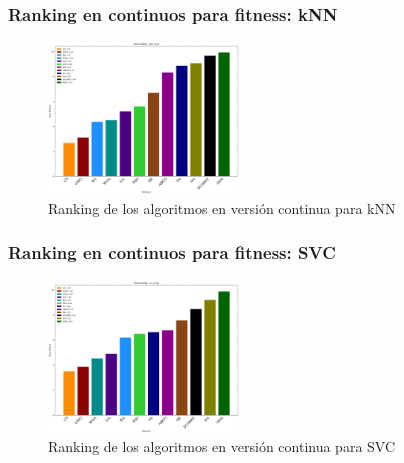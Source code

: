 \begin{frame}
    \frametitle{Ranking en continuos para fitness: kNN}
    \begin{figure}
        \begin{center}
            \includegraphics[width=0.45\textwidth]{imagenes/chapter5/rankings_knn_avg_real.png}
        \end{center}
        \caption{Ranking de los algoritmos en versión continua para kNN}
    \end{figure}
\end{frame}
\begin{frame}
    \frametitle{Ranking en continuos para fitness: SVC}
    \begin{figure}
        \begin{center}
            \includegraphics[width=0.45\textwidth]{imagenes/chapter5/rankings_svc_avg_real.png}
        \end{center}
        \caption{Ranking de los algoritmos en versión continua para SVC}
    \end{figure}
\end{frame}

